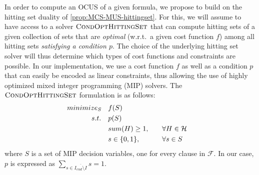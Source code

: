 \documentclass[twoside,11pt]{article}
\newcommand\m[1]{\mathcal{#1}}
\newcommand\comment[1]{\marginpar{\tiny #1}}
\renewcommand\comment[1]{#1}
\newcommand{\emilio}[1]{{\comment{\color{red}Emilio: #1}}}
\newcommand{\bart}[1]{{\comment{\color{green}Bart: #1}}}
\newcommand\setstohit{\ensuremath{\m{H} }\xspace}
\newcommand\Iend{\ensuremath{I_\mathit{end} }\xspace}
\newcommand\formula{\ensuremath{\m{F} }\xspace}
\newcommand\mm[1]{\ensuremath{#1}\xspace}
\newcommand\call[1]{\mm{\textsc{#1}}}
\newcommand\cohs{\mm{\call{CondOptHittingSet}}}
\begin{document}
In order to compute an OCUS of a given formula, we propose to build on the hitting set duality of \cref{prop:MCS-MUS-hittingset}. 
For this, we will assume to have access to a solver \cohs that can compute hitting sets of a given collection of sets that are \emph{optimal} (w.r.t.\ a given cost function $f$) among all hitting sets \emph{satisfying a condition $p$}. 
The choice of the underlying hitting set solver will thus determine which types of cost functions and constraints are possible. 
In our implementation, we use a cost function $f$ as well as a condition $p$ that can easily be encoded as linear constraints, thus allowing the use of highly optimized mixed integer programming (MIP) solvers. The \cohs formulation is as follows:
\begin{align*}
\small
minimize_S \quad & f(S) \\ 
s.t. \quad & p(S) \\
  & sum(H) \geq 1, \quad &   & \forall H \in \setstohit \\
  & s \in \{0,1\}, \quad &   & \forall s \in S          
\end{align*}
where $S$ is a set of MIP decision variables, one for every clause in $\formula$. In our case, $p$ is expressed as $\sum_{s \in \overline{\Iend\setminus I}} s = 1$. 
\end{document}

